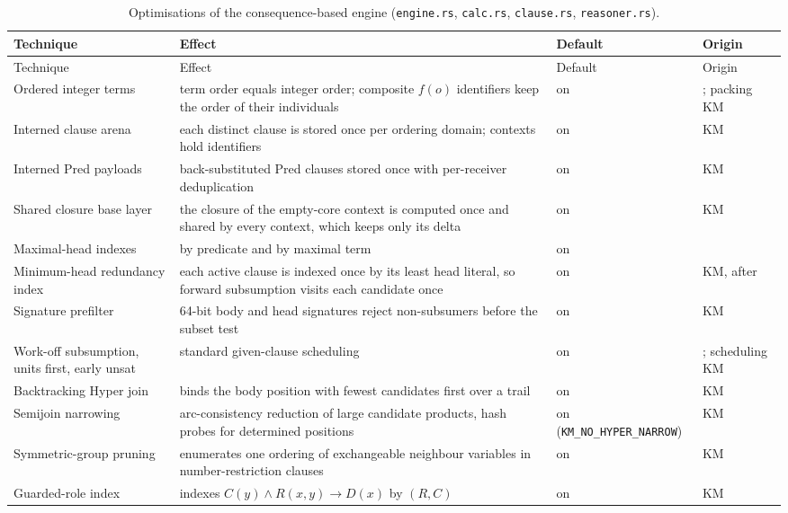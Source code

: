 \begin{small}
\begin{longtable}{@{}p{}p{}p{}p{}@{}}
\caption{Optimisations of the consequence-based engine (\texttt{engine.rs},
\texttt{calc.rs}, \texttt{clause.rs}, \texttt{reasoner.rs}).}
\label{tab:opt-cb}\\
\toprule
Technique & Effect & Default & Origin\\
\midrule
\endfirsthead
\toprule
Technique & Effect & Default & Origin\\
\midrule
\endhead
Ordered integer terms & term order equals integer order; composite $f(o)$ identifiers keep the order of their individuals & on & \cite{tenacucala2019sequoia}; packing KM\\
Interned clause arena & each distinct clause is stored once per ordering domain; contexts hold identifiers & on & KM\\
Interned Pred payloads & back-substituted Pred clauses stored once with per-receiver deduplication & on & KM\\
Shared closure base layer & the closure of the empty-core context is computed once and shared by every context, which keeps only its delta & on & KM\\
Maximal-head indexes & by predicate and by maximal term & on & \cite{tenacucala2019sequoia}\\
Minimum-head redundancy index & each active clause is indexed once by its least head literal, so forward subsumption visits each candidate once & on & KM, after \cite{tenacucala2019sequoia}\\
Signature prefilter & 64-bit body and head signatures reject non-subsumers before the subset test & on & KM\\
Work-off subsumption, units first, early unsat & standard given-clause scheduling & on & \cite{bachmair1994rewrite}; scheduling KM\\
Backtracking Hyper join & binds the body position with fewest candidates first over a trail & on & KM\\
Semijoin narrowing & arc-consistency reduction of large candidate products, hash probes for determined positions & on (\texttt{KM\_NO\_HYPER\_NARROW}) & KM\\
Symmetric-group pruning & enumerates one ordering of exchangeable neighbour variables in number-restriction clauses & on & KM\\
Guarded-role index & indexes $C(y)\wedge R(x,y)\rightarrow D(x)$ by $(R,C)$ & on & KM\\

\end{longtable}
\end{small}

